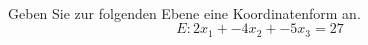 \begin{aufgabe} ~ \\ 
Geben Sie zur folgenden Ebene eine Koordinatenform an.\[E: 2x_1 + -4x_2 + -5x_3 = 27\]\end{aufgabe} 
